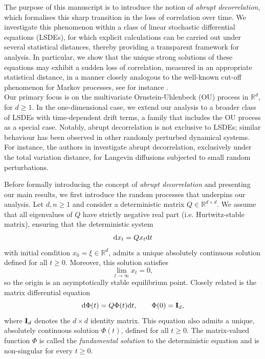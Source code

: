 \documentclass[12pt,thmsa]{article}
\begin{document}
The purpose of this manuscript is to introduce the notion of {\it abrupt decorrelation}, which formalises this sharp transition in the loss of correlation over time. We investigate this phenomenon within a class of linear stochastic differential equations (LSDEs), for which explicit calculations can be carried out under several statistical distances, thereby providing a transparent framework for analysis. In particular, we show that the unique strong solutions of these equations may exhibit a sudden loss of correlation, measured in an appropriate statistical distance, in a manner closely analogous to the well-known cut-off phenomenon for Markov processes, see for instance \cite{AlDi}.
\\


Our primary focus is on the multivariate Ornstein-Uhlenbeck (OU) process in $\mathbb{R}^d$, for $d\ge 1$. In the one-dimensional case, we extend our analysis to a broader class of LSDEs with time-dependent drift terms, a family that includes the OU process as a special case. Notably, abrupt decorrelation is not exclusive to LSDEs; similar behaviour has been observed in other randomly perturbed dynamical systems. For instance, the authors in \cite{BLPP1} investigate abrupt decorrelation, exclusively under the  total variation distance, for Langevin diffusions subjected to small random perturbations. 

Before formally introducing the concept of {\it abrupt decorrelation} and presenting our main results, we first introduce the random processes that underpins our analysis. Let $d, n\ge 1$ and consider a deterministic matrix $Q\in \mathbb{R}^{d\times d}$. We  assume that all eigenvalues of  $Q$  have strictly negative real part (i.e. Hurtwitz-stable matrix), ensuring that the  deterministic system 
\begin{equation}\label{difeq}
{\rm d}x_t=Qx_t {\rm d}t
\end{equation}
with initial condition $x_0=\xi\in \mathbb{R}^d$, admits a unique absolutely continuous solution defined for  all $ t\ge 0$. Moreover, this solution satisfies
\[
\lim_{t\to\infty} x_t=0,
\]
so  the origin  is an asymptotically stable equilibrium point. Closely related  is the matrix differential equation
\[
{\rm d}\Phi(t)=Q\Phi(t){\rm d}t, \qquad \Phi(0)={\bf I}_d,
\]
where ${\bf I}_d$ denotes the $d\times d$ identity matrix.  This equation also admits a unique, absolutely continuous solution $\Phi(t)$, defined for all $t\ge 0$. The matrix-valued function $\Phi$ is called the  {\it fundamental solution} to the deterministic equation   and  is non-singular for every $t\ge0$.
\end{document}

